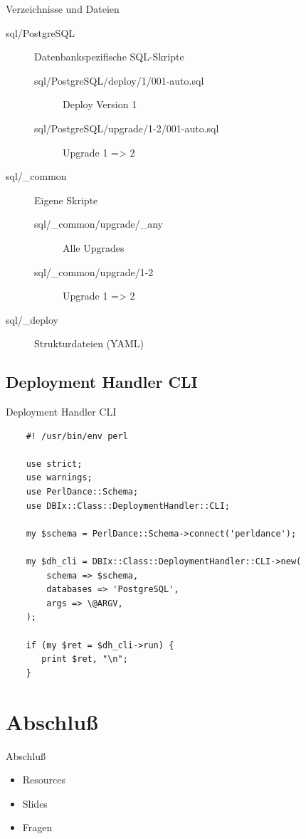 \begin{frame}[fragile]{Verzeichnisse und Dateien}
\begin{description}
\item[sql/PostgreSQL] Datenbankspezifische SQL-Skripte
\begin{description}
\item[sql/PostgreSQL/deploy/1/001-auto.sql] Deploy Version 1
\item[sql/PostgreSQL/upgrade/1-2/001-auto.sql] Upgrade 1 => 2
\end{description}
\item[sql/\_common] Eigene Skripte
\begin{description}
\item[sql/\_common/upgrade/\_any] Alle Upgrades
\item[sql/\_common/upgrade/1-2] Upgrade 1 => 2
\end{description}
\item[sql/\_deploy] Strukturdateien (YAML)
\end{description}
\end{frame}

\subsection{Deployment Handler CLI}

\begin{frame}[fragile]{Deployment Handler CLI}
\begin{lstlisting}
    #! /usr/bin/env perl

    use strict;
    use warnings;
    use PerlDance::Schema;
    use DBIx::Class::DeploymentHandler::CLI;

    my $schema = PerlDance::Schema->connect('perldance');

    my $dh_cli = DBIx::Class::DeploymentHandler::CLI->new(
        schema => $schema,
        databases => 'PostgreSQL',
        args => \@ARGV,
    );

    if (my $ret = $dh_cli->run) {
       print $ret, "\n";
    }
\end{lstlisting}
\end{frame}

\section{Abschluß}

\begin{frame}{Abschluß}
\begin{itemize}
\item Resources
\item Slides
\item Fragen
\end{itemize}
\end{frame}

